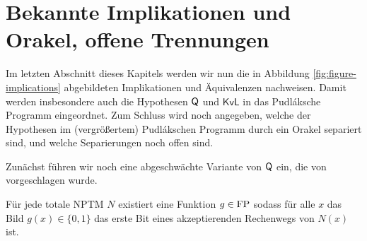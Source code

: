 

\section{Bekannte Implikationen und Orakel, offene Trennungen}

Im letzten Abschnitt dieses Kapitels werden wir nun die in Abbildung \ref{fig:figure-implications} abgebildeten Implikationen und Äquivalenzen nachweisen.
Damit werden insbesondere auch die Hypothesen $\mathsf{Q}$ und $\mathsf{KvL}$ in das Pudláksche Programm eingeordnet.
Zum Schluss wird noch angegeben, welche der Hypothesen im (vergrößertem) Pudlákschen Programm durch ein Orakel separiert sind, und welche Separierungen noch offen sind.

Zunächst führen wir noch eine abgeschwächte Variante von $\mathsf{Q}$ ein, die von \textcite{fenner_inverting_2003} vorgeschlagen wurde.

\begin{conjecture}
    Für jede totale NPTM $N$ existiert eine Funktion $g\in\mathrm{FP}$ sodass für alle $x$ das Bild $g(x)\in\{0,1\}$ das erste Bit eines akzeptierenden Rechenwegs von $N(x)$ ist. 
\end{conjecture}

